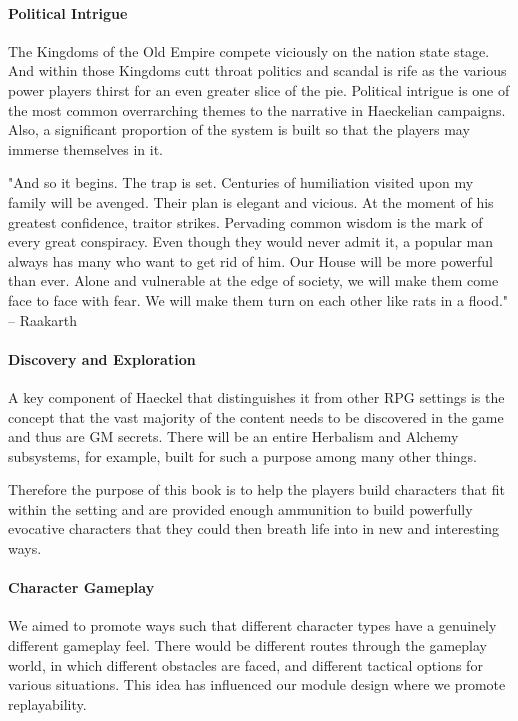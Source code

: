 \begin{multicols}{2}
\paragraph{Political Intrigue} The Kingdoms of the Old Empire compete viciously on the nation state stage. And within those Kingdoms cutt throat politics and scandal is rife as the various power players thirst for an even greater slice of the pie. Political intrigue is one of the most common overrarching themes to the narrative in Haeckelian campaigns. Also, a significant proportion of the system is built so that the players may immerse themselves in it.

\begin{snugshade} "And so it begins. The trap is set. Centuries of humiliation visited upon my family will be avenged. Their plan is elegant and vicious. At the moment of his greatest confidence, traitor strikes. Pervading common wisdom is the mark of every great conspiracy. Even though they would never admit it, a popular man always has many who want to get rid of him. Our House will be more powerful than ever. Alone and vulnerable at the edge of society, we will make them come face to face with fear. We will make them turn on each other like rats in a flood." -- Raakarth \end{snugshade}

\paragraph{Discovery and Exploration} A key component of Haeckel that distinguishes it from other RPG settings is the concept that the vast majority of the content needs to be discovered in the game and thus are GM secrets. There will be an entire Herbalism and Alchemy subsystems, for example, built for such a purpose among many other things. 

Therefore the purpose of this book is to help the players build characters that fit within the setting and are provided enough ammunition to build powerfully evocative characters that they could then breath life into in new and interesting ways. 

\paragraph{Character Gameplay} We aimed to promote ways such that different character types have a genuinely different gameplay feel. There would be different routes through the gameplay world, in which different obstacles are faced, and different tactical options for various situations. This idea has influenced our module design where we promote replayability. 
 

\end{multicols}
